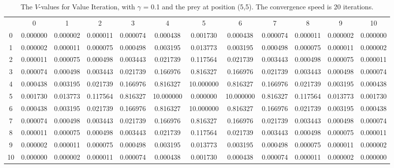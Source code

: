 \documentclass{article}
\begin{document}
\newpage
\begin{landscape}

\begin{table}[tbp]
\centering
\begin{tabular} {c c c c c c c c c c c c}
 & 0 & 1 & 2 & 3 & 4 & 5 & 6 & 7 & 8 & 9 & 10 \\
0 & 0.000000 & 0.000002 & 0.000011 & 0.000074 & 0.000438 & 0.001730 & 0.000438 & 0.000074 & 0.000011 & 0.000002 & 0.000000\\
1 & 0.000002 & 0.000011 & 0.000075 & 0.000498 & 0.003195 & 0.013773 & 0.003195 & 0.000498 & 0.000075 & 0.000011 & 0.000002\\
2& 0.000011 & 0.000075 & 0.000498 & 0.003443 & 0.021739 & 0.117564 & 0.021739 & 0.003443 & 0.000498 & 0.000075 & 0.000011\\
3 & 0.000074 & 0.000498 & 0.003443 & 0.021739 & 0.166976 & 0.816327 & 0.166976 & 0.021739 & 0.003443 & 0.000498 & 0.000074\\
4 & 0.000438 & 0.003195 & 0.021739 & 0.166976 & 0.816327 & 10.000000 & 0.816327 & 0.166976 & 0.021739 & 0.003195 & 0.000438\\
5 & 0.001730 & 0.013773 & 0.117564 & 0.816327 & 10.000000 & 0.000000 & 10.000000 & 0.816327 & 0.117564 & 0.013773 & 0.001730\\
6 & 0.000438 & 0.003195 & 0.021739 & 0.166976 & 0.816327 & 10.000000 & 0.816327 & 0.166976 & 0.021739 & 0.003195 & 0.000438\\
7 & 0.000074 & 0.000498 & 0.003443 & 0.021739 & 0.166976 & 0.816327 & 0.166976 & 0.021739 & 0.003443 & 0.000498 & 0.000074\\
8 & 0.000011 & 0.000075 & 0.000498 & 0.003443 & 0.021739 & 0.117564 & 0.021739 & 0.003443 & 0.000498 & 0.000075 & 0.000011\\
9 & 0.000002 & 0.000011 & 0.000075 & 0.000498 & 0.003195 & 0.013773 & 0.003195 & 0.000498 & 0.000075 & 0.000011 & 0.000002\\
10 & 0.000000 & 0.000002 & 0.000011 & 0.000074 & 0.000438 & 0.001730 & 0.000438 & 0.000074 & 0.000011 & 0.000002 & 0.000000\\
\end{tabular}\\
\caption{The $V$-values for Value Iteration, with $\gamma$ = 0.1 and the prey at position (5,5). The convergence speed is 20 iterations.}
\label{valueiterationone}
\end{table}


\end{landscape}
\end{document}
